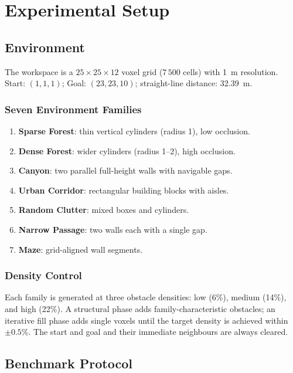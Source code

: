 \documentclass[10pt,twocolumn]{article}
\begin{document}
\section{Experimental Setup}\label{sec:experiments}

\subsection{Environment}

The workspace is a $25 \times 25 \times 12$ voxel grid ($7\,500$ cells)
with 1~m resolution.
Start: $(1,1,1)$; Goal: $(23,23,10)$; straight-line distance: 32.39~m.

\subsubsection{Seven Environment Families}
\begin{enumerate}
  \item \textbf{Sparse Forest}: thin vertical cylinders (radius 1), low occlusion.
  \item \textbf{Dense Forest}: wider cylinders (radius 1--2), high occlusion.
  \item \textbf{Canyon}: two parallel full-height walls with navigable gaps.
  \item \textbf{Urban Corridor}: rectangular building blocks with aisles.
  \item \textbf{Random Clutter}: mixed boxes and cylinders.
  \item \textbf{Narrow Passage}: two walls each with a single gap.
  \item \textbf{Maze}: grid-aligned wall segments.
\end{enumerate}

\subsubsection{Density Control}
Each family is generated at three obstacle densities: low (6\%),
medium (14\%), and high (22\%).
A structural phase adds family-characteristic obstacles; an iterative
fill phase adds single voxels until the target density is achieved
within $\pm0.5\%$.
The start and goal and their immediate neighbours are always cleared.

\subsection{Benchmark Protocol}
\end{document}

